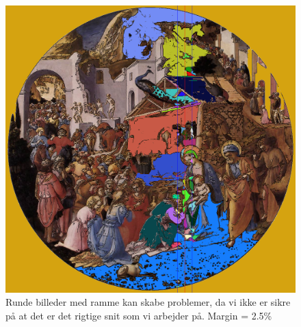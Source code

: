 \begin{figure}[h!!]
	\begin{center}
		\includegraphics[scale=0.3,angle=0]{afsnit/afprovning/billeder/FFadorat.png}
	\end{center}
	\caption[]{Runde billeder med ramme kan skabe problemer, da vi ikke
	er sikre på at det er det rigtige snit som vi arbejder på. Margin =
	2.5\%}
	\label{FFadorat}
\end{figure}

